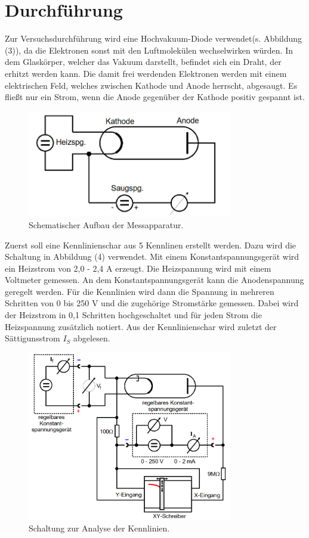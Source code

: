 \section{Durchführung}
\label{sec:Durchführung}

Zur Versuchsdurchführung wird eine Hochvakuum-Diode verwendet(s. Abbildung (3)), da die Elektronen sonst mit den Luftmolekülen wechselwirken würden.
In dem Glaskörper, welcher das Vakuum darstellt, befindet sich ein Draht, der erhitzt werden kann. Die damit frei werdenden Elektronen werden mit einem elektrischen Feld, welches zwischen Kathode und Anode herrscht, abgesaugt.
Es fließt nur ein Strom, wenn die Anode gegenüber der Kathode positiv gespannt ist.
\begin{figure}[H]
  \centering
  \includegraphics[width=0.8\textwidth]{aufbau.png}
  \caption{Schematischer Aufbau der Messapparatur\cite{kent}.}
  \label{fig:aufbau}
\end{figure}
\noindent Zuerst soll eine Kennlinienschar aus 5 Kennlinen erstellt werden. Dazu wird die Schaltung in Abbildung (4) verwendet. Mit einem Konstantspannungsgerät wird ein Heizstrom von 2,0 - 2,4 $\si{\ampere}$ erzeugt. Die Heizspannung wird mit einem Voltmeter gemessen. An dem Konstantspannungsgerät kann die Anodenspannung geregelt werden.
Für die Kennlinien wird dann die Spannung in mehreren Schritten von 0 bis 250 $\si{\volt}$ und die zugehörige Stromstärke gemessen. Dabei wird der Heizstrom in 0,1 Schritten hochgeschaltet und für jeden Strom die Heizspannung zusätzlich notiert.
Aus der Kennlinienschar wird zuletzt der Sättigunsstrom $I_S$ abgelesen.
\begin{figure}[H]
  \centering
  \includegraphics[width=0.8\textwidth]{1.png}
  \caption{Schaltung zur Analyse der Kennlinien\cite{kent}.}
  \label{fig:aufbau}
\end{figure}
